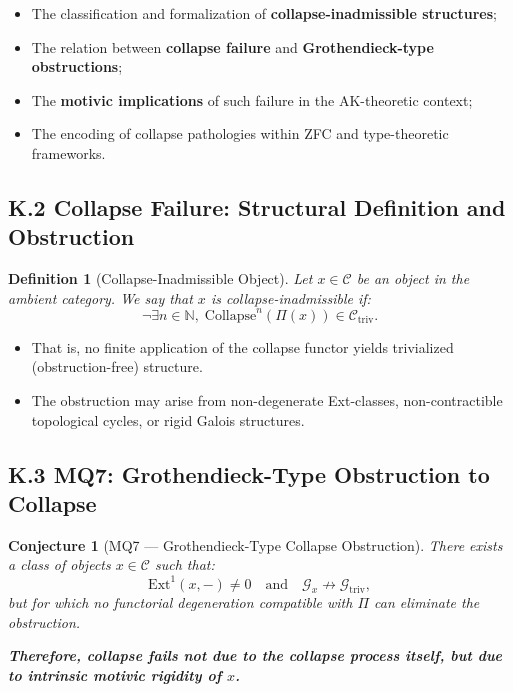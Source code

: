 \documentclass[11pt]{article}
\newtheorem{definition}[theorem]{Definition}
\newtheorem{conjecture}{Conjecture}[section]
\begin{document}
\begin{itemize}
    \item The classification and formalization of \textbf{collapse-inadmissible structures};
    \item The relation between \textbf{collapse failure} and \textbf{Grothendieck-type obstructions};
    \item The \textbf{motivic implications} of such failure in the AK-theoretic context;
    \item The encoding of collapse pathologies within ZFC and type-theoretic frameworks.
\end{itemize}

\subsection*{K.2 Collapse Failure: Structural Definition and Obstruction}

\begin{definition}[Collapse-Inadmissible Object]
Let $x \in \mathcal{C}$ be an object in the ambient category. We say that $x$ is \emph{collapse-inadmissible} if:
\[
\neg\exists n \in \mathbb{N}, \; \mathrm{Collapse}^n(\Pi(x)) \in \mathcal{C}_{\mathrm{triv}}.
\]
\end{definition}

\begin{itemize}
    \item That is, no finite application of the collapse functor yields trivialized (obstruction-free) structure.
    \item The obstruction may arise from non-degenerate Ext-classes, non-contractible topological cycles, or rigid Galois structures.
\end{itemize}

\subsection*{K.3 MQ7: Grothendieck-Type Obstruction to Collapse}

\begin{conjecture}[MQ7 — Grothendieck-Type Collapse Obstruction]
There exists a class of objects $x \in \mathcal{C}$ such that:
\[
\mathrm{Ext}^1(x, -) \neq 0 \quad \text{and} \quad \mathcal{G}_x \not\rightarrow \mathcal{G}_{\mathrm{triv}},
\]
but for which no functorial degeneration compatible with $\Pi$ can eliminate the obstruction.

\textbf{Therefore, collapse fails not due to the collapse process itself, but due to intrinsic motivic rigidity of $x$.}
\end{conjecture}
\end{document}
